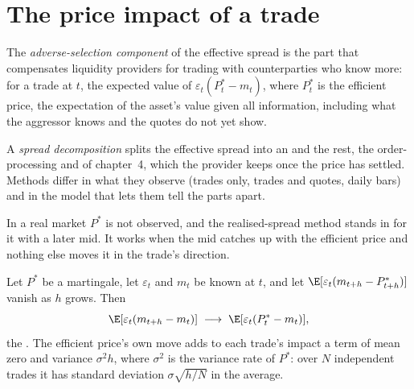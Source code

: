 \section{The price impact of a trade}

\begin{definition}\label{def:mx:decomposing-the-spread:adverse}
The \emph{adverse-selection component} of the effective spread is the part that compensates liquidity providers for
trading with counterparties who know more: for a trade at $t$, the expected value of $\varepsilon_t(P^\ast_t-m_t)$, where $P^\ast_t$ is the efficient price,
the expectation of the asset's value given all information, including what the aggressor knows and the quotes do not yet show.
\end{definition}

\begin{definition}\label{def:mx:decomposing-the-spread:decomposition}
A \emph{spread decomposition} splits the effective spread into an  and the rest, the
order-processing and  of chapter~4, which the provider keeps once the price has settled. Methods differ in what they observe
(trades only, trades and quotes, daily bars) and in the model that lets them tell the parts apart.
\end{definition}

In a real market $P^\ast$ is not observed, and the realised-spread method stands in for it with a later mid. It works when the mid catches up with the
efficient price and nothing else moves it in the trade's direction.

\begin{proposition}\label{prop:mx:decomposing-the-spread:converge}
Let $P^\ast$ be a martingale, let $\varepsilon_t$ and $m_t$ be known at $t$, and let $\E[\varepsilon_t(m_{t+h}-P^\ast_{t+h})]$ vanish as $h$ grows. Then
\[
\E[\varepsilon_t(m_{t+h}-m_t)]\;\longrightarrow\;\E[\varepsilon_t(P^\ast_t-m_t)],
\]
the . The efficient price's own move adds to each trade's impact a term of mean zero and variance $\sigma^2h$, where
$\sigma^2$ is the variance rate of $P^\ast$: over $N$ independent trades it has standard deviation $\sigma\sqrt{h/N}$ in the average.
\end{proposition}

